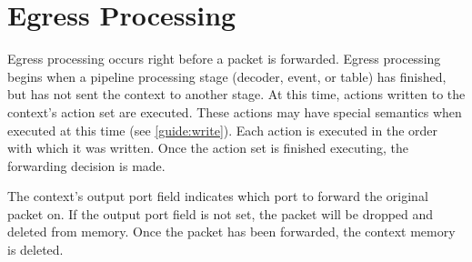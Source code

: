 \section{Egress Processing} \label{egress_process}

Egress processing occurs right before a packet is forwarded. Egress processing begins when a pipeline processing stage (decoder, event, or table) has finished, but has not sent the context to another stage. At this time, actions written to the context's action set are executed. These actions may have special semantics when executed at this time (see \ref{guide:write}). Each action is executed in the order with which it was written. Once the action set is finished executing, the forwarding decision is made.

The context's output port field indicates which port to forward the original packet on. If the output port field is not set, the packet will be dropped and deleted from memory. Once the packet has been forwarded, the context memory is deleted. 